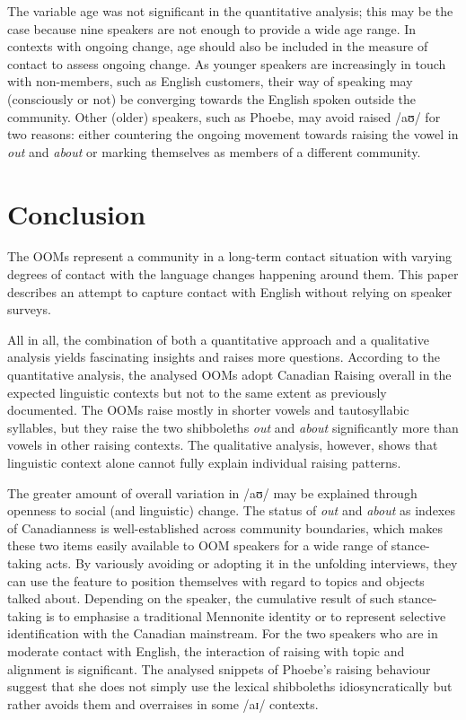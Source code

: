 \documentclass[output=paper]{langscibook}
\begin{document}
The variable age was not significant in the quantitative analysis; this may be the case because nine speakers are not enough to provide a wide age range. In contexts with ongoing change, age should also be included in the measure of contact to assess ongoing change. As younger speakers are increasingly in touch with non-members, such as English customers, their way of speaking may (consciously or not) be converging towards the English spoken outside the community. Other (older) speakers, such as Phoebe, may avoid raised /aʊ/ for two reasons: either countering the ongoing movement towards raising the vowel in \textit{out} and \textit{about} or marking themselves as members of a different community.

\section{Conclusion}
The \glspl*{OOM} represent a community in a long-term contact situation with varying degrees of contact with the language changes happening around them. This paper describes an attempt to capture contact with English without relying on speaker surveys. 

All in all, the combination of both a quantitative approach and a qualitative analysis yields fascinating insights and raises more questions. According to the quantitative analysis, the analysed \glspl*{OOM} adopt Canadian Raising overall in the expected linguistic contexts but not to the same extent as previously documented. The \glspl*{OOM} raise mostly in shorter vowels and tautosyllabic syllables, but they raise the two shibboleths \textit{out} and \textit{about} significantly more than vowels in other raising contexts. The qualitative analysis, however, shows that linguistic context alone cannot fully explain individual raising patterns. 

The greater amount of overall variation in /aʊ/ may be explained through openness to social (and linguistic) change. The status of \textit{out} and \textit{about} as indexes of Canadianness is well-established across community boundaries, which makes these two items easily available to \gls*{OOM} speakers for a wide range of stance-taking acts. By variously avoiding or adopting it in the unfolding interviews, they can use the feature to position themselves with regard to topics and objects talked about. Depending on the speaker, the cumulative result of such stance-taking is to emphasise a traditional Mennonite identity or to represent selective identification with the Canadian mainstream. For the two speakers who are in moderate contact with English, the interaction of raising with topic and alignment is significant. The analysed snippets of Phoebe’s raising behaviour suggest that she does not simply use the lexical shibboleths idiosyncratically but rather avoids them and overraises in some /aɪ/ contexts.
\end{document}
